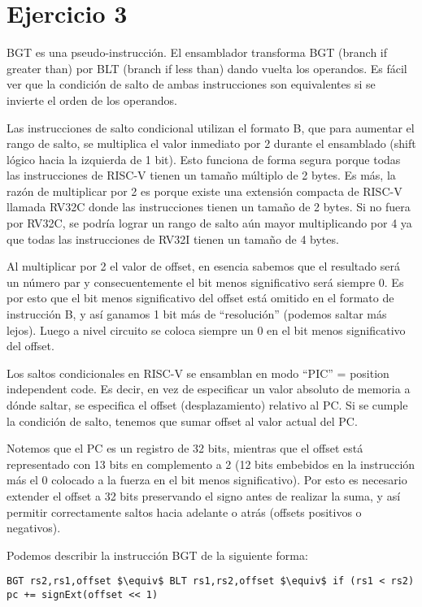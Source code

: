 \section{Ejercicio 3}

BGT es una pseudo-instrucción. El ensamblador transforma BGT (branch if greater than) por BLT (branch if less than) dando vuelta los operandos. Es fácil ver que la condición de salto de ambas instrucciones son equivalentes si se invierte el orden de los operandos.

Las instrucciones de salto condicional utilizan el formato B, que para aumentar el rango de salto, se multiplica el valor inmediato por 2 durante el ensamblado (shift lógico hacia la izquierda de 1 bit). Esto funciona de forma segura porque todas las instrucciones de RISC-V tienen un tamaño múltiplo de 2 bytes. Es más, la razón de multiplicar por 2 es porque existe una extensión compacta de RISC-V llamada RV32C donde las instrucciones tienen un tamaño de 2 bytes. Si no fuera por RV32C, se podría lograr un rango de salto aún mayor multiplicando por 4 ya que todas las instrucciones de RV32I tienen un tamaño de 4 bytes.

Al multiplicar por 2 el valor de offset, en esencia sabemos que el resultado será un número par y consecuentemente el bit menos significativo será siempre 0. Es por esto que el bit menos significativo del offset está omitido en el formato de instrucción B, y así ganamos 1 bit más de ``resolución'' (podemos saltar más lejos). Luego a nivel circuito se coloca siempre un 0 en el bit menos significativo del offset.

Los saltos condicionales en RISC-V se ensamblan en modo ``PIC'' = position independent code. Es decir, en vez de especificar un valor absoluto de memoria a dónde saltar, se especifica el offset (desplazamiento) relativo al PC. Si se cumple la condición de salto, tenemos que sumar offset al valor actual del PC.

Notemos que el PC es un registro de 32 bits, mientras que el offset está representado con 13 bits en complemento a 2 (12 bits embebidos en la instrucción más el 0 colocado a la fuerza en el bit menos significativo). Por esto es necesario extender el offset a 32 bits preservando el signo antes de realizar la suma, y así permitir correctamente saltos hacia adelante o atrás (offsets positivos o negativos).

Podemos describir la instrucción BGT de la siguiente forma:

\lstinline{BGT rs2,rs1,offset $\equiv$ BLT rs1,rs2,offset $\equiv$ if (rs1 < rs2) pc += signExt(offset << 1)}

